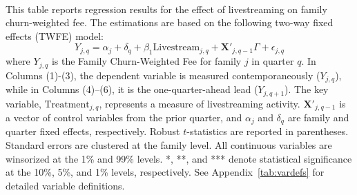 \begin{table}[!ht]
    \centering

    \caption{Dynamic Livestream Effect on Family Churn-Weighted Fee}\label{tab:family_twfe_churnweightedfee_reallocation}  

    \begin{minipage}{0.95\textwidth}
        \footnotesize
        This table reports regression results for the effect of livestreaming on family churn-weighted fee. The estimations are based on the following two-way fixed effects (TWFE) model:
        \begin{equation*}
            Y_{j,q} = \alpha_j + \delta_q + \beta_1 \text{Livestream}_{j,q} + \mathbf{X}'_{j,q-1} \Gamma + \epsilon_{j,q}
        \end{equation*}
        where $Y_{j,q}$ is the Family Churn-Weighted Fee for family $j$ in quarter $q$. In Columns (1)-(3), the dependent variable is measured contemporaneously ($Y_{j,q}$), while in Columns (4)--(6), it is the one-quarter-ahead lead ($Y_{j,q+1}$). The key variable, $\text{Treatment}_{j,q}$, represents a measure of livestreaming activity. $\mathbf{X}'_{j,q-1}$ is a vector of control variables from the prior quarter, and $\alpha_j$ and $\delta_q$ are family and quarter fixed effects, respectively. Robust $t$-statistics are reported in parentheses. Standard errors are clustered at the family level. All continuous variables are winsorized at the 1\% and 99\% levels. *, **, and *** denote statistical significance at the 10\%, 5\%, and 1\% levels, respectively. See Appendix~\ref{tab:vardefs} for detailed variable definitions. %
    \end{minipage}

    \vspace{2mm}

    

\end{table}